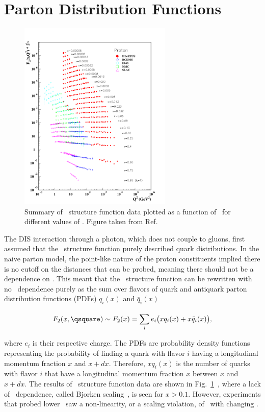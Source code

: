 \section{Parton Distribution Functions}


\begin{figure}
	\centerline{
		\includegraphics[width=0.65\textwidth]{figures/f2collider_logf2.pdf} 
	}
	\caption{ Summary of \ftwo\ structure function data plotted as a function of \qsquare\ for different values of \xb. Figure taken from Ref.~\cite{pdg:2018} }
	\label{fig:f2}
\end{figure}



The DIS interaction through a photon, which does not couple to gluons, first assumed that the \ftwo\ structure function purely described quark distributions. In the naive parton model, the point-like nature of the proton constituents implied there is no cutoff on the distances that can be probed, meaning there should not be a dependence on \qsquare. This meant that the \ftwo\ structure function can be rewritten with no \qsquare\ dependence purely as the sum over flavors of quark and antiquark parton distribution functions (PDFs) $q_{i}(x)$ and $\bar{q}_{i}(x)$

\begin{equation}
F_{2}(x,\qsquare) \sim F_{2}(x) = \sum_{i}^{}e_{i}\big(xq_{i}(x) + x\bar{q}_{i}(x)\big),
\end{equation}

where $e_{i}$ is their respective charge. The PDFs are probability density functions representing the probability of finding a quark with flavor $i$ having a longitudinal momentum fraction $x$ and $x+dx$. Therefore, $xq_{i}(x)$ is the number of quarks with flavor $i$ that have a longitudinal momentum fraction $x$ between $x$ and $x+dx$. The results of \ftwo\ structure function data are shown in Fig.~\ref{fig:f2}~\cite{Abramowicz:2014jak, Pasechnik:2016wkt, Adams:1996gu, Evans:2008zzb,Whitlow:1991uw}, where a lack of \qsquare\ dependence, called Bjorken scaling~\cite{Bjorken:1968dy}, is seen for $x>0.1$. However, experiments that probed lower \xb\ saw a non-linearity, or a scaling violation, of \ftwo\ with changing \qsquare.

